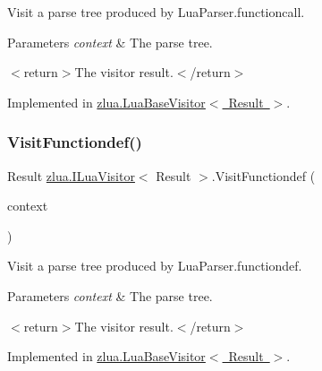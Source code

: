Visit a parse tree produced by Lua\+Parser.\+functioncall. 


\begin{DoxyParams}{Parameters}
{\em context} & The parse tree.\\
\hline
\end{DoxyParams}
$<$return$>$The visitor result.$<$/return$>$ 

Implemented in \mbox{\hyperlink{classzlua_1_1_lua_base_visitor_a17082d557201566c36ec9f056b20274d}{zlua.\+Lua\+Base\+Visitor$<$ Result $>$}}.

\mbox{\label{interfacezlua_1_1_i_lua_visitor_aa4ae9c9b23327ffa825c98325c4a228e}} 
\subsubsection{\texorpdfstring{Visit\+Functiondef()}{VisitFunctiondef()}}
{\footnotesize\ttfamily Result \mbox{\hyperlink{interfacezlua_1_1_i_lua_visitor}{zlua.\+I\+Lua\+Visitor}}$<$ Result $>$.Visit\+Functiondef (\begin{DoxyParamCaption}\item[{\mbox{[}\+Not\+Null\mbox{]} \mbox{\hyperlink{classzlua_1_1_lua_parser_1_1_functiondef_context}{Lua\+Parser.\+Functiondef\+Context}}}]{context }\end{DoxyParamCaption})}



Visit a parse tree produced by Lua\+Parser.\+functiondef. 


\begin{DoxyParams}{Parameters}
{\em context} & The parse tree.\\
\hline
\end{DoxyParams}
$<$return$>$The visitor result.$<$/return$>$ 

Implemented in \mbox{\hyperlink{classzlua_1_1_lua_base_visitor_ae443f2f4b5993febf577b31721ba8588}{zlua.\+Lua\+Base\+Visitor$<$ Result $>$}}.

\mbox{\label{interfacezlua_1_1_i_lua_visitor_a866d0dc7a283123ec21f9f279f7f647a}} 
